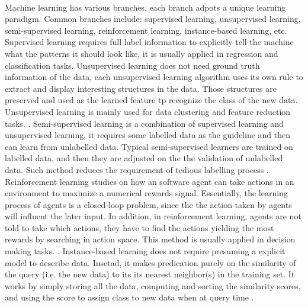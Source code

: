 \\Machine learning has various branches, each branch adpots a unique learning paradigm. Common branches include: supervised learning, unsupervised learning, semi-supervised learning, reinforcement learning, instance-based learning, etc. Supervised learning requires full label information to explicitly tell the machine what the patterns it should look like, it is usually applied in regression and classification tasks\cite{singh2016review}. Unsupervised learning does not need ground truth information of the data, each unsupervised learning algorithm uses its own rule to extract and display interesting structures in the data. Those structures are preserved and used as the learned feature tp recognize the class of the new data. Unsupervised learning is mainly used for data clustering and feature reduction tasks. \cite{mahesh2020machine}. Semi-supervised learning is a combination of supervised learning and unsupervised learning, it requires some labelled data as the guideline and then can learn from unlabelled data. Typical semi-supervised learners are trained on labelled data, and then they are adjusted on the the validation of unlabelled data. Such method reduces the requirement of tedious labelling process \cite{zhu2009introduction}. Reinforcement learning studies on how an software agent can take actions in an environment to maximize a numerical rewards signal. Essentially, the learning process of agents is a closed-loop problem, since the the action taken by agents will influent the later input. In addition, in reinforcement learning, agents are not told to take which actions, they have to find the actions yielding the most rewards by searching in action space. This method is usually applied in decision making tasks. \cite{sutton2018reinforcement}. Instance-based learning does not require presuming a explicit model to describe data. Insetad, it makes predication purely on the similarity of the query (i.e. the new data) to its its nearest neighbor(s) in the training set. It works by simply storing all the data, computing and sorting the similarity scores, and using the score to assign class to new data when at query time \cite{mahesh2020machine}.

